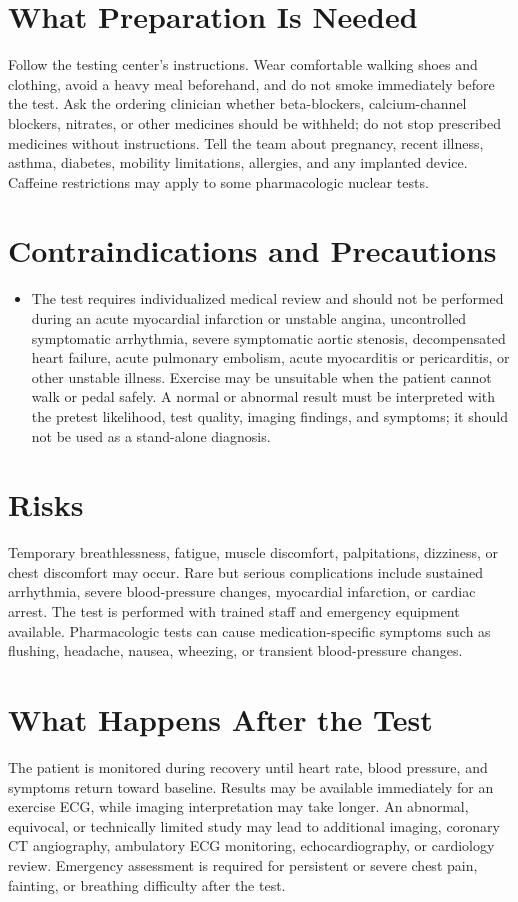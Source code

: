 \section*{What Preparation Is Needed}
Follow the testing center's instructions. Wear comfortable walking shoes and clothing, avoid a heavy meal beforehand, and do not smoke immediately before the test. Ask the ordering clinician whether beta-blockers, calcium-channel blockers, nitrates, or other medicines should be withheld; do not stop prescribed medicines without instructions. Tell the team about pregnancy, recent illness, asthma, diabetes, mobility limitations, allergies, and any implanted device. Caffeine restrictions may apply to some pharmacologic nuclear tests.

\section*{Contraindications and Precautions}
\begin{itemize}
  \item The test requires individualized medical review and should not be performed during an acute myocardial infarction or unstable angina, uncontrolled symptomatic arrhythmia, severe symptomatic aortic stenosis, decompensated heart failure, acute pulmonary embolism, acute myocarditis or pericarditis, or other unstable illness. Exercise may be unsuitable when the patient cannot walk or pedal safely. A normal or abnormal result must be interpreted with the pretest likelihood, test quality, imaging findings, and symptoms; it should not be used as a stand-alone diagnosis.
\end{itemize}
\section*{Risks}
Temporary breathlessness, fatigue, muscle discomfort, palpitations, dizziness, or chest discomfort may occur. Rare but serious complications include sustained arrhythmia, severe blood-pressure changes, myocardial infarction, or cardiac arrest. The test is performed with trained staff and emergency equipment available. Pharmacologic tests can cause medication-specific symptoms such as flushing, headache, nausea, wheezing, or transient blood-pressure changes.

\section*{What Happens After the Test}
The patient is monitored during recovery until heart rate, blood pressure, and symptoms return toward baseline. Results may be available immediately for an exercise ECG, while imaging interpretation may take longer. An abnormal, equivocal, or technically limited study may lead to additional imaging, coronary CT angiography, ambulatory ECG monitoring, echocardiography, or cardiology review. Emergency assessment is required for persistent or severe chest pain, fainting, or breathing difficulty after the test.

